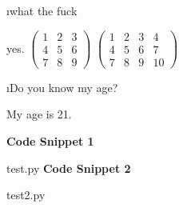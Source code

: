 \documentclass[fleqn]{article}
\begin{document}
\bee
\i what the fuck
\begin{tcolorbox}
yes. \newline  \newline  $\begin{pmatrix}
1 & 2 & 3\\
4 & 5 & 6\\
7 & 8 & 9
\end{pmatrix}$
 \newline  $\begin{pmatrix}
1 & 2 & 3 & 4\\
4 & 5 & 6 & 7\\
7 & 8 & 9 & 10
\end{pmatrix}$

\end{tcolorbox}
\i Do you know my age?
\begin{tcolorbox}
My age is 21.
\end{tcolorbox}
\ene
\leavevmode\newline
\textbf{Code Snippet 1}

{test.py}
\textbf{Code Snippet 2}

{test2.py}
\end{document}
